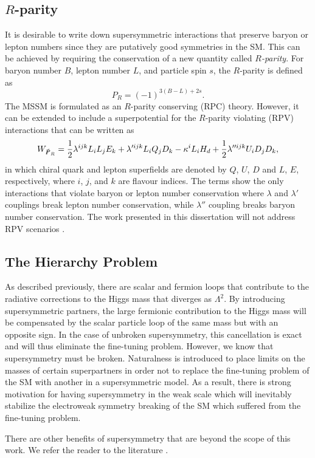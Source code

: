\subsection*{$R$-parity}

It is desirable to write down supersymmetric interactions that preserve baryon or lepton numbers since 
they are putatively good symmetries in the SM.
This can be achieved by requiring the conservation of a new quantity called \textit{$R$-parity}. 
For baryon number $B$, lepton number $L$, and particle spin $s$, the $R$-parity is defined as
\begin{equation}
P_R = \left(-1\right)^{3\left(B-L\right)+2s}.
\end{equation}
The MSSM is formulated as an $R$-parity conserving (RPC) theory. 
However, it can be extended to include a superpotential for the $R$-parity violating (RPV) interactions 
that can be written as
\begin{equation}
W_{\slashed{P}_R} = \frac{1}{2}\lambda^{ijk}L_iL_jE_k + \lambda'^{ijk}L_iQ_jD_k - \kappa^i L_i H_d  + \frac{1}{2}\lambda''^{ijk}U_iD_jD_k,
\end{equation}
in which chiral quark and lepton superfields are denoted by $Q$, $U$, $D$ and $L$, $E$, respectively,
where $i$, $j$, and $k$ are flavour indices. 
The terms show the only interactions that violate baryon or lepton number conservation where 
$\lambda$ and $\lambda'$ couplings break lepton number conservation, while  $\lambda''$ coupling breaks 
baryon number conservation. The work presented in this dissertation will not address RPV scenarios
\cite{Barbier:2004ez}.


\subsection{The Hierarchy Problem}

As described previously, there are scalar and fermion loops that contribute to the radiative corrections 
to the Higgs mass that diverges as $\Lambda^2$. By introducing supersymmetric partners, the 
large fermionic  contribution  to the Higgs mass will be compensated by the scalar particle loop of the 
same mass but with an opposite sign. In the case of unbroken supersymmetry, this cancellation is exact and 
will thus eliminate the fine-tuning problem. However, we know that supersymmetry must be broken.
Naturalness is introduced to place limits on the masses of certain superpartners in order not to replace the 
fine-tuning problem of the SM with another in a supersymmetric model. As a result, there is strong 
motivation for having supersymmetry in the weak scale which will inevitably stabilize the electroweak 
symmetry breaking of the SM which suffered from the fine-tuning problem.

There are other benefits of supersymmetry that are beyond the scope of this 
work. We refer the reader to the literature 
\cite{howiebook,Martin:1997ns,Ellis:2015cva}.
